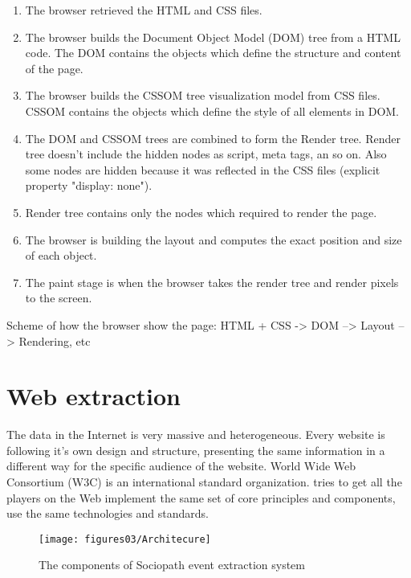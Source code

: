 \begin{enumerate}
    \item The browser retrieved the HTML and CSS files.
    \item The browser builds the Document Object Model (DOM) tree from a HTML code. The DOM contains the objects which define the structure and content of the page.
    \item The browser builds the CSSOM tree visualization model from CSS files. CSSOM contains the objects which define the style of all elements in DOM.
    \item The DOM and CSSOM trees are combined to form the Render tree. Render tree doesn't include the hidden nodes as script, meta tags, an so on. Also some nodes are hidden because it was reflected in the CSS files (explicit property "display: none").
    \item Render tree contains only the nodes which required to render the page.
    \item The browser is building the layout and computes the exact position and size of each object.
    \item The paint stage is when the browser takes the render tree and render pixels to the screen. 
    
\end{enumerate}


Scheme of how the browser show the page: HTML + CSS -> DOM --> Layout --> Rendering, etc

\section{Web extraction}

The data in the Internet is very massive and heterogeneous. Every website is following it's own design and structure, presenting the same information in a different way for the specific audience of the website. World Wide Web Consortium (W3C) is an international standard organization. tries to get all the players on the Web implement the same set of core principles and components, use the same technologies and standards. 

\begin{figure}[h]
\begin{center}
\texttt{[image: figures03/Architecure]}
\caption{The components of Sociopath event extraction system}
\label{fig:architecture}
\end{center}
\end{figure}


